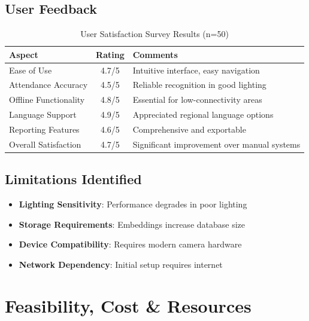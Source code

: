 \documentclass[12pt,a4paper]{article}
\newcommand{\important}[1]{\textbf{\textcolor{accent}{#1}}}
\begin{document}
\subsection{User Feedback}
\begin{table}[H]
\centering
\small
\begin{tabularx}{\textwidth}{|l|c|X|}
\hline
\rowcolor{lightgray}
\textbf{Aspect} & \textbf{Rating} & \textbf{Comments} \\
\hline
Ease of Use & 4.7/5 & Intuitive interface, easy navigation \\
\hline
Attendance Accuracy & 4.5/5 & Reliable recognition in good lighting \\
\hline
Offline Functionality & 4.8/5 & Essential for low-connectivity areas \\
\hline
Language Support & 4.9/5 & Appreciated regional language options \\
\hline
Reporting Features & 4.6/5 & Comprehensive and exportable \\
\hline
Overall Satisfaction & 4.7/5 & Significant improvement over manual systems \\
\hline
\end{tabularx}
\caption{User Satisfaction Survey Results (n=50)}
\end{table}

\subsection{Limitations Identified}
\begin{itemize}[leftmargin=*, itemsep=0.2em]
    \item \important{Lighting Sensitivity}: Performance degrades in poor lighting
    \item \important{Storage Requirements}: Embeddings increase database size
    \item \important{Device Compatibility}: Requires modern camera hardware
    \item \important{Network Dependency}: Initial setup requires internet
\end{itemize}

\newpage

\section{Feasibility, Cost \& Resources}
\end{document}
